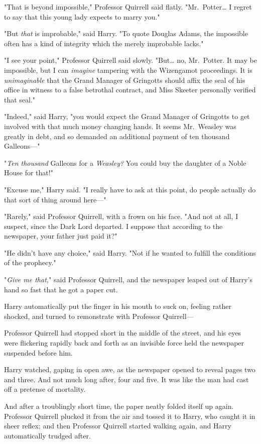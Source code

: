 "That is beyond impossible," Professor Quirrell said flatly.
"Mr.~Potter{\ldots} I regret to say that this young lady expects to marry you."

"But \emph{that} is improbable," said Harry. "To quote Douglas Adams, the
impossible often has a kind of integrity which the merely improbable lacks."

"I see your point," Professor Quirrell said slowly. "But{\ldots} no,
Mr.~Potter. It may be impossible, but I can \emph{imagine} tampering with the
Wizengamot proceedings. It is \emph{unimaginable} that the Grand Manager of
Gringotts should affix the seal of his office in witness to a false betrothal
contract, and Miss Skeeter personally verified that seal."

"Indeed," said Harry, "you would expect the Grand Manager of Gringotts to get
involved with that much money changing hands. It seems Mr.~Weasley was greatly
in debt, and so demanded an additional payment of ten thousand Galleons---"

"\emph{Ten thousand} Galleons for a \emph{Weasley?} You could buy the daughter
of a Noble House for that!"

"Excuse me," Harry said. "I really have to ask at this point, do people
actually do that sort of thing around here---"

"Rarely," said Professor Quirrell, with a frown on his face. "And not at all, I
suspect, since the Dark Lord departed. I suppose that according to the
newspaper, your father just paid it?"

"He didn't have any choice," said Harry. "Not if he wanted to fulfill the
conditions of the prophecy."

"\emph{Give me that,}" said Professor Quirrell, and the newspaper leaped out of
Harry's hand so fast that he got a paper cut.

Harry automatically put the finger in his mouth to suck on, feeling rather
shocked, and turned to remonstrate with Professor Quirrell---

Professor Quirrell had stopped short in the middle of the street, and his eyes
were flickering rapidly back and forth as an invisible force held the newspaper
suspended before him.

Harry watched, gaping in open awe, as the newspaper opened to reveal pages two
and three. And not much long after, four and five. It was like the man had cast
off a pretense of mortality.

And after a troublingly short time, the paper neatly folded itself up again.
Professor Quirrell plucked it from the air and tossed it to Harry, who caught
it in sheer reflex; and then Professor Quirrell started walking again, and
Harry automatically trudged after.


